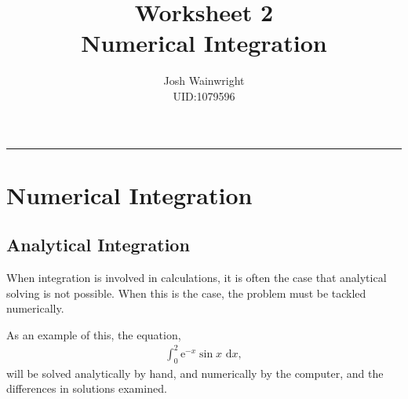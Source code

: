 \documentclass[11pt]{article} %
\author{Josh Wainwright \\ UID:1079596}
\title{Worksheet 2 \\ Numerical Integration}
\date{}
\renewcommand{\d}{\,\mathrm{d}} %
\newcommand{\e}[1]{\text{e}^{#1}} %
\begin{document}
\maketitle
\tableofcontents
\vspace{1cm}\hrule \vspace{1cm}
	\setcounter{section}{1}
	\section{Numerical Integration}
	\subsection{Analytical Integration}
	When integration is involved in calculations, it is often the case that analytical solving is not possible. When this is the case, the problem must be tackled numerically. 

	As an example of this, the equation,
	\begin{align}
		\int_0^2 \e{-x}\sin x\,\d x,
	\end{align}	
	will be solved analytically by hand, and numerically by the computer, and the differences in solutions examined.
\end{document}

